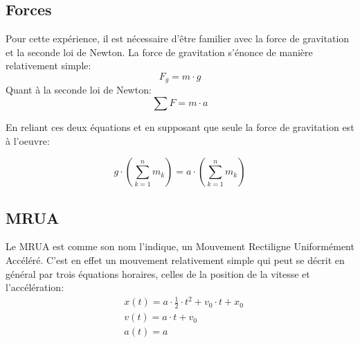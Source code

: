 \subsection{Forces}
Pour cette expérience, il est nécessaire d'être familier avec la force de gravitation et la seconde loi de Newton.
La force de gravitation s'énonce de manière relativement simple:
\begin{equation}
    F_g = m \cdot g
\end{equation}
Quant à la seconde loi de Newton:
\begin{equation}
    \sum F = m \cdot a
\end{equation}

En reliant ces deux équations et en supposant que seule la force de gravitation est à l'oeuvre:

\begin{equation}
    g \cdot (\sum^{n}_{k=1}m_k) = a \cdot (\sum^{n}_{k=1}m_k)
\end{equation}

\subsection{MRUA}
Le MRUA est comme son nom l'indique, un Mouvement Rectiligne Uniformément Accéléré. C'est en effet un mouvement relativement simple qui peut se décrit en général par trois équations horaires, celles de la position de la vitesse et l'accélération:
\begin{align}
    & x(t) = a\cdot \frac{1}{2} \cdot t^2 + v_0 \cdot t + x_0 \\
    & v(t) = a \cdot t + v_0 \\
    & a(t) = a
\end{align}

